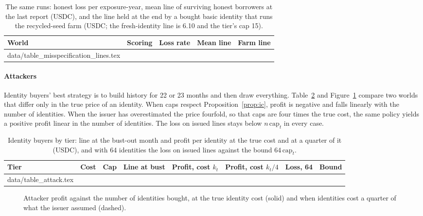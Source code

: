\documentclass[preprint,11pt,authoryear]{elsarticle}
\makeatletter
\newcommand{\inputrows}[1]{\@@input #1 }
\makeatother
\begin{document}
\begin{table}[ht]
  \centering\small
  \caption{The same runs: honest loss per exposure-year, mean line of surviving honest borrowers at
  the last report (USDC), and the line held at the end by a bought basic identity that runs the
  recycled-seed farm (USDC; the fresh-identity line is 6.10 and the tier's cap 15).}
  \label{tab:misspeclines}
  \begin{tabular}{llrrr}
    \toprule
    World & Scoring & Loss rate & Mean line & Farm line \\
    \midrule
    \inputrows{data/table_misspecification_lines.tex}
    \bottomrule
  \end{tabular}
\end{table}

\paragraph{Attackers} Identity buyers' best strategy is to build history for 22 or 23 months and
then draw everything. Table~\ref{tab:attack} and Figure~\ref{fig:attack} compare two worlds that differ
only in the true price of an identity. When caps respect Proposition~\ref{prop:ic}, profit is negative
and falls linearly with the number of identities. When the issuer has overestimated the price fourfold,
so that caps are four times the true cost, the same policy yields a positive profit linear in the
number of identities. The loss on issued lines stays below $n\,\mathrm{cap}_t$ in every case.

\begin{table}[ht]
  \centering\small
  \caption{Identity buyers by tier: line at the bust-out month and profit per identity at the true
  cost and at a quarter of it (USDC), and with 64 identities the loss on issued lines against the
  bound $64\,\mathrm{cap}_t$.}
  \label{tab:attack}
  \begin{tabular}{lrrrrrrr}
    \toprule
    Tier & Cost & Cap & Line at bust & Profit, cost $k_t$ & Profit, cost $k_t/4$ & Loss, 64 & Bound \\
    \midrule
    \inputrows{data/table_attack.tex}
    \bottomrule
  \end{tabular}
\end{table}

\begin{figure}[ht]
  \centering
  
  \caption{Attacker profit against the number of identities bought, at the true identity cost (solid)
  and when identities cost a quarter of what the issuer assumed (dashed).}
  \label{fig:attack}
\end{figure}
\end{document}
